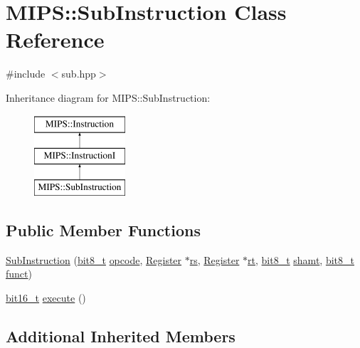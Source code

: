 \hypertarget{classMIPS_1_1SubInstruction}{}\section{M\+I\+PS\+:\+:Sub\+Instruction Class Reference}
\label{classMIPS_1_1SubInstruction}


{\ttfamily \#include $<$sub.\+hpp$>$}

Inheritance diagram for M\+I\+PS\+:\+:Sub\+Instruction\+:\begin{figure}[H]
\begin{center}
\leavevmode
\includegraphics[height=3.000000cm]{classMIPS_1_1SubInstruction}
\end{center}
\end{figure}
\subsection*{Public Member Functions}
\begin{DoxyCompactItemize}
\item 
\hyperlink{classMIPS_1_1SubInstruction_af6979540068224336b460cb680690ecf}{Sub\+Instruction} (\hyperlink{core_8hpp_a6074bae122ae7b527864eec42c728c3c}{bit8\+\_\+t} \hyperlink{classMIPS_1_1Instruction_a45cc6808b5dde8a5d41067d148b55476}{opcode}, \hyperlink{classMIPS_1_1Register}{Register} $\ast$\hyperlink{classMIPS_1_1InstructionI_a2be191d5b3dce505e2e626ec02eb4d62}{rs}, \hyperlink{classMIPS_1_1Register}{Register} $\ast$\hyperlink{classMIPS_1_1InstructionI_add1db07a5c954f35271de8c8a5737487}{rt}, \hyperlink{core_8hpp_a6074bae122ae7b527864eec42c728c3c}{bit8\+\_\+t} \hyperlink{classMIPS_1_1InstructionI_aa9b6da37c374c2ec8d96448d341e5e7d}{shamt}, \hyperlink{core_8hpp_a6074bae122ae7b527864eec42c728c3c}{bit8\+\_\+t} \hyperlink{classMIPS_1_1InstructionI_a5c6efcbbd233a7447c1fe24ea0a1e558}{funct})
\item 
\hyperlink{core_8hpp_adc265a970bc35995b5879784bbb3f1b7}{bit16\+\_\+t} \hyperlink{classMIPS_1_1SubInstruction_a2b10f6bfda0e7d9651600b530cfccf62}{execute} ()
\end{DoxyCompactItemize}
\subsection*{Additional Inherited Members}


